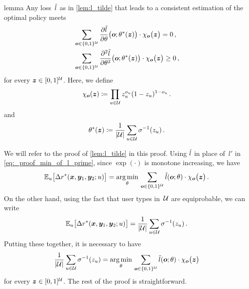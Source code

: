 \begin{proofEnd}
    \begin{theoremEnd}[restate]{lemma}
    \label{lem:characterize_l_tilde}
    Any loss~${\tilde{l}}$ as in \cref{lem:l_tilde} that leads to a consistent estimation of the optimal policy meets
    \begin{align*}
        &\sum_{\vo \in \{0, 1\}^{\gU}} \pd{\till}{\theta}\big(\vo; \theta^*(\vz)\big) \cdot \chi_\vo\big(\vz\big) = 0 \,, \\
        &\sum_{\vo \in \{0, 1\}^{\gU}} \pd[2]{\till}{\theta}\big(\vo; \theta^*(\vz)\big) \cdot \chi_\vo\big(\vz\big) \ge 0 
        \,,
    \end{align*}
    for every ${\bm{z}} \in [0, 1]^{{\mathcal{U}}}$. Here, we define
    \begin{equation*}
        \chi_{\bm{o}}({\bm{z}}) \coloneqq \prod_{u \in {\mathcal{U}}} z_u^{o_u} (1 - z_u)^{1 - o_u}
        \,.
    \end{equation*}
    and 
    \begin{equation*}
        \theta^*({\bm{z}}) \coloneqq \frac{1}{|{\mathcal{U}}|} \sum_{u \in {\mathcal{U}}} \sigma^{-1}(z_u)
        \,.
    \end{equation*}
    \end{theoremEnd}
    \begin{proofEnd}
        We will refer to the proof of \cref{lem:l_tilde} in this proof. Using ${\tilde{l}}$ in place of~$l'$ in \cref{eq:_proof_min_of_l_prime}, since $\exp(\cdot)$ is monotone increasing, we have
        \begin{equation*}
            \mathbb{E}_u\big[\Delta r^*({\bm{x}}, {\bm{y}}_1, {\bm{y}}_2; u)\big] = 
            \operatorname*{arg\,min}_{\theta} \, 
            \sum_{{\bm{o}} \in \{0, 1\}^{{\mathcal{U}}}} {\tilde{l}}({\bm{o}}; \theta) \cdot \chi_{\bm{o}}\big({\bm{z}}\big)
            \,.
        \end{equation*}
        On the other hand, using the fact that user types in~${\mathcal{U}}$ are equiprobable, we can write 
        \begin{equation*}
            \mathbb{E}_u\big[\Delta r^*({\bm{x}}, {\bm{y}}_1, {\bm{y}}_2; u)\big] 
            = \frac{1}{|{\mathcal{U}}|} \sum_{u \in {\mathcal{U}}} \sigma^{-1}(z_u)
            \,.
        \end{equation*}
        Putting these together, it is necessary to have
        \begin{equation*}
            \frac{1}{|{\mathcal{U}}|} \sum_{u \in {\mathcal{U}}} \sigma^{-1}(z_u) = 
            \operatorname*{arg\,min}_{\theta} \, 
            \sum_{{\bm{o}} \in \{0, 1\}^{{\mathcal{U}}}} {\tilde{l}}({\bm{o}}; \theta) \cdot \chi_{\bm{o}}\big({\bm{z}}\big)
        \end{equation*}
        for every ${\bm{z}} \in [0, 1]^{{\mathcal{U}}}$. The rest of the proof is straightforward.
    \end{proofEnd}
    

\end{proofEnd}

